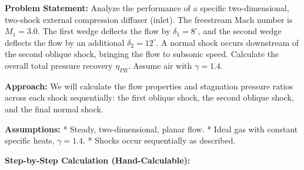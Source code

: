 \textbf{Problem Statement:} Analyze the performance of a specific
two-dimensional, two-shock external compression diffuser (inlet). The
freestream Mach number is \(M_1 = 3.0\). The first wedge deflects the
flow by \(\delta_1 = 8^\circ\), and the second wedge deflects the flow
by an additional \(\delta_2 = 12^\circ\). A normal shock occurs
downstream of the second oblique shock, bringing the flow to subsonic
speed. Calculate the overall total pressure recovery \(\eta_{PR}\).
Assume air with \(\gamma = 1.4\).

\textbf{Approach:} We will calculate the flow properties and stagnation
pressure ratios across each shock sequentially: the first oblique shock,
the second oblique shock, and the final normal shock.

\textbf{Assumptions:} * Steady, two-dimensional, planar flow. * Ideal
gas with constant specific heats, \(\gamma = 1.4\). * Shocks occur
sequentially as described.

\textbf{Step-by-Step Calculation (Hand-Calculable):}

